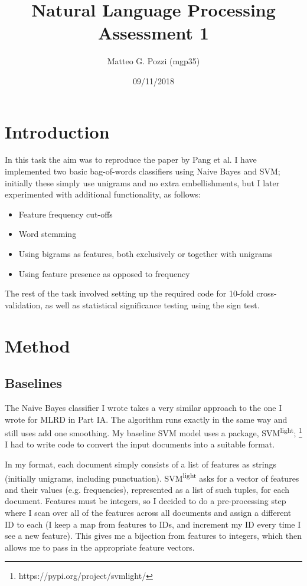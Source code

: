 \documentclass[12pt,a4paper,twoside]{article}
\title{%
  Natural Language Processing \\
  \large Assessment 1}
\author{Matteo G. Pozzi (mgp35)}
\date{09/11/2018}
\begin{document}
\maketitle

\section{Introduction}

In this task the aim was to reproduce the paper by Pang et al. I have implemented two basic bag-of-words classifiers using Naive Bayes and SVM; initially these simply use unigrams and no extra embellishments, but I later experimented with additional functionality, as follows:

\begin{itemize}
\item Feature frequency cut-offs
\item Word stemming
\item Using bigrams as features, both exclusively or together with unigrams
\item Using feature presence as opposed to frequency
\end{itemize}

The rest of the task involved setting up the required code for 10-fold cross-validation, as well as statistical significance testing using the sign test.

\section{Method}

\subsection{Baselines}

The Naive Bayes classifier I wrote takes a very similar approach to the one I wrote for MLRD in Part IA. The algorithm runs exactly in the same way and still uses add one smoothing. My baseline SVM model uses a package, SVM\textsuperscript{light}; \footnote{https://pypi.org/project/svmlight/} I had to write code to convert the input documents into a suitable format.

In my format, each document simply consists of a list of features as strings (initially unigrams, including punctuation). SVM\textsuperscript{light} asks for a vector of features and their values (e.g. frequencies), represented as a list of such tuples, for each document. Features must be integers, so I decided to do a pre-processing step where I scan over all of the features across all documents and assign a different ID to each (I keep a map from features to IDs, and increment my ID every time I see a new feature). This gives me a bijection from features to integers, which then allows me to pass in the appropriate feature vectors.
\end{document}
